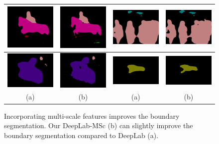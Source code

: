 \begin{figure}[ht]
  \centering
  \begin{tabular}{c c | c c}
      \includegraphics[height=0.14\linewidth]{fig/boundary_refine/vgg128noup_2007_000783.png} &
      \includegraphics[height=0.14\linewidth]{fig/boundary_refine/vgg128ms_2007_000783.png} &
      \includegraphics[height=0.14\linewidth]{fig/boundary_refine/vgg128noup_2007_001284.png} &
      \includegraphics[height=0.14\linewidth]{fig/boundary_refine/vgg128ms_2007_001284.png} \\
      \hline
      \includegraphics[height=0.12\linewidth]{fig/boundary_refine/vgg128noup_2007_001239.png} &
      \includegraphics[height=0.12\linewidth]{fig/boundary_refine/vgg128ms_2007_001239.png} &
      \includegraphics[height=0.12\linewidth]{fig/boundary_refine/vgg128noup_2007_001289.png} &
      \includegraphics[height=0.12\linewidth]{fig/boundary_refine/vgg128ms_2007_001289.png} \\
      (a) & (b) & (a) & (b) \\ 
  \end{tabular}
  \caption{Incorporating multi-scale features improves the boundary segmentation. Our DeepLab-MSc (b) can slightly improve the boundary segmentation compared to DeepLab (a).}
  \label{fig:msBoundary}
\end{figure}



